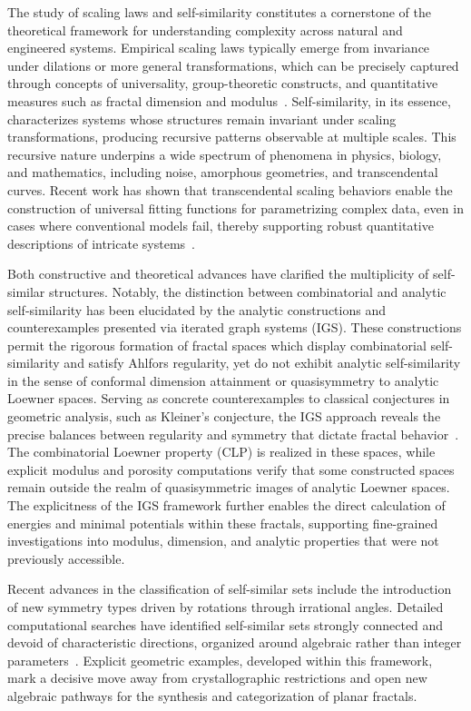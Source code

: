 \documentclass[sigconf]{acmart}
\begin{document}
The study of scaling laws and self-similarity constitutes a cornerstone of the theoretical framework for understanding complexity across natural and engineered systems. Empirical scaling laws typically emerge from invariance under dilations or more general transformations, which can be precisely captured through concepts of universality, group-theoretic constructs, and quantitative measures such as fractal dimension and modulus~\cite{ref56,ref63}. Self-similarity, in its essence, characterizes systems whose structures remain invariant under scaling transformations, producing recursive patterns observable at multiple scales. This recursive nature underpins a wide spectrum of phenomena in physics, biology, and mathematics, including noise, amorphous geometries, and transcendental curves. Recent work has shown that transcendental scaling behaviors enable the construction of universal fitting functions for parametrizing complex data, even in cases where conventional models fail, thereby supporting robust quantitative descriptions of intricate systems~\cite{ref56,ref63}.

Both constructive and theoretical advances have clarified the multiplicity of self-similar structures. Notably, the distinction between combinatorial and analytic self-similarity has been elucidated by the analytic constructions and counterexamples presented via iterated graph systems (IGS). These constructions permit the rigorous formation of fractal spaces which display combinatorial self-similarity and satisfy Ahlfors regularity, yet do not exhibit analytic self-similarity in the sense of conformal dimension attainment or quasisymmetry to analytic Loewner spaces. Serving as concrete counterexamples to classical conjectures in geometric analysis, such as Kleiner's conjecture, the IGS approach reveals the precise balances between regularity and symmetry that dictate fractal behavior~\cite{ref11}. The combinatorial Loewner property (CLP) is realized in these spaces, while explicit modulus and porosity computations verify that some constructed spaces remain outside the realm of quasisymmetric images of analytic Loewner spaces. The explicitness of the IGS framework further enables the direct calculation of energies and minimal potentials within these fractals, supporting fine-grained investigations into modulus, dimension, and analytic properties that were not previously accessible.

Recent advances in the classification of self-similar sets include the introduction of new symmetry types driven by rotations through irrational angles. Detailed computational searches have identified self-similar sets strongly connected and devoid of characteristic directions, organized around algebraic rather than integer parameters~\cite{ref31}. Explicit geometric examples, developed within this framework, mark a decisive move away from crystallographic restrictions and open new algebraic pathways for the synthesis and categorization of planar fractals.
\end{document}

